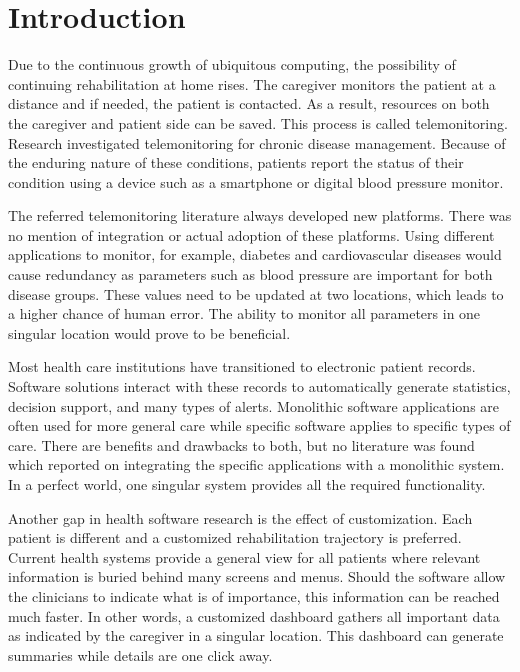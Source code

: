 \section{Introduction}

Due to the continuous growth of ubiquitous computing, the possibility of continuing rehabilitation at home rises. The caregiver monitors the patient at a distance and if needed, the patient is contacted. As a result, resources on both the caregiver and patient side can be saved. This process is called telemonitoring. Research investigated telemonitoring for chronic disease management. Because of the enduring nature of these conditions, patients report the status of their condition using a device such as a smartphone or digital blood pressure monitor.

\sloppy The referred telemonitoring literature always developed new platforms. There was no mention of integration or actual adoption of these platforms. Using different applications to monitor, for example, diabetes and cardiovascular diseases would cause redundancy as parameters such as blood pressure are important for both disease groups. These values need to be updated at two locations, which leads to a higher chance of human error. The ability to monitor all parameters in one singular location would prove to be beneficial.

Most health care institutions have transitioned to electronic patient records. Software solutions interact with these records to automatically generate statistics, decision support, and many types of alerts. Monolithic software applications are often used for more general care while specific software applies to specific types of care. There are benefits and drawbacks to both, but no literature was found which reported on integrating the specific applications with a monolithic system. In a perfect world, one singular system provides all the required functionality.

Another gap in health software research is the effect of customization. Each patient is different and a customized rehabilitation trajectory is preferred. Current health systems provide a general view for all patients where relevant information is buried behind many screens and menus. Should the software allow the clinicians to indicate what is of importance, this information can be reached much faster. In other words, a customized dashboard gathers all important data as indicated by the caregiver in a singular location. This dashboard can generate summaries while details are one click away. 

